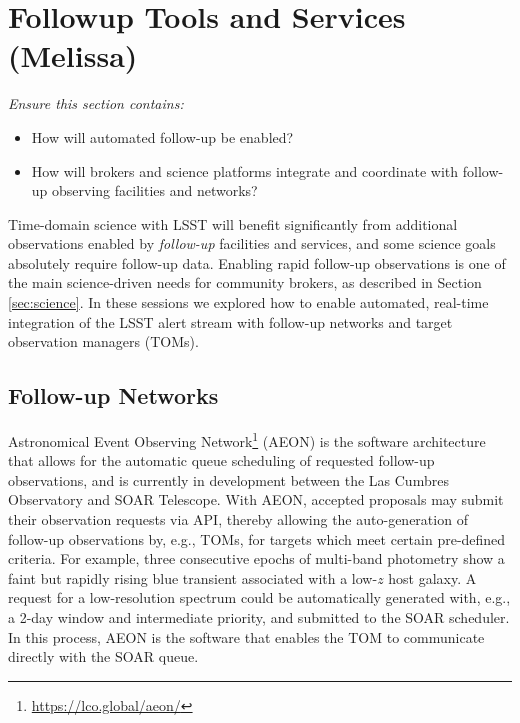 \section{Followup Tools and Services (Melissa)} \label{sec:followup}


\smallskip

\noindent
{\it Ensure this section contains:
\begin{itemize}
    \item How will automated follow-up be enabled?
    \item How will brokers and science platforms integrate and coordinate with
follow-up observing facilities and networks?
\end{itemize}
}

Time-domain science with LSST will benefit significantly from additional observations enabled by \emph{follow-up} facilities and services, and some science goals absolutely require follow-up data. Enabling rapid follow-up observations is one of the main science-driven needs for community brokers, as described in Section \ref{sec:science}. In these sessions we explored how to enable automated, real-time integration of the LSST alert stream with follow-up networks and target observation managers (TOMs).

\subsection{Follow-up Networks}

Astronomical Event Observing Network\footnote{\url{https://lco.global/aeon/}} (AEON) is the software architecture that allows for the automatic queue scheduling of requested follow-up observations, and is currently in development between the Las Cumbres Observatory and SOAR Telescope. With AEON, accepted proposals may submit their observation requests via API, thereby allowing the auto-generation of follow-up observations by, e.g., TOMs, for targets which meet certain pre-defined criteria. For example, three consecutive epochs of multi-band photometry show a faint but rapidly rising blue transient associated with a low-$z$ host galaxy. A request for a low-resolution spectrum could be automatically generated with, e.g., a 2-day window and intermediate priority, and submitted to the SOAR scheduler. In this process, AEON is the software that enables the TOM to communicate directly with the SOAR queue. 

